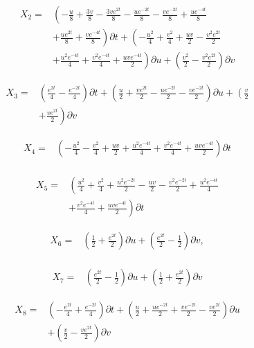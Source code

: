 \begin{align*}
X_{2}=&\left(- \frac{u}{8}+\frac{3 v}{8}- \frac{3 v e^{2 t}}{8}- \frac{u e^{- 2 t}}{8}- \frac{v e^{- 2 t}}{8}+\frac{u e^{- 4 t}}{8}\right.\\
&+\left.\frac{u e^{2 t}}{8}+\frac{v e^{- 4 t}}{8} \right)\partial t+\left(- \frac{u^{2}}{4}+\frac{v^{2}}{4}+\frac{u v}{2}- \frac{v^{2} e^{2 t}}{2}\right.\\
&+\left.\frac{u^{2} e^{- 4 t}}{4}+\frac{v^{2} e^{- 4 t}}{4}+\frac{u v e^{- 4 t}}{2} \right)\partial u+\left(\frac{v^{2}}{2}- \frac{v^{2} e^{2 t}}{2} \right)\partial v
\end{align*}

\begin{align*}
X_{3}=&\left(\frac{e^{2 t}}{4} - \frac{e^{- 2 t}}{4} \right)\partial t+\left(\frac{u}{2}+\frac{v e^{2 t}}{2}- \frac{u e^{- 2 t}}{2}- \frac{v e^{- 2 t}}{2} \right)\partial u+\left(\frac{v}{2}\right.\\
&+\left.\frac{v e^{2 t}}{2} \right)\partial v
\end{align*}

\begin{align*}
X_{4}=&\left(- \frac{u^{2}}{4}- \frac{v^{2}}{4}+\frac{u v}{2}+\frac{u^{2} e^{- 4 t}}{4}+\frac{v^{2} e^{- 4 t}}{4}+\frac{u v e^{- 4 t}}{2} \right)\partial t\\
\end{align*}

\begin{align*}
X_{5}=&\left(\frac{u^{2}}{4}+\frac{v^{2}}{4}+\frac{u^{2} e^{- 2 t}}{2}- \frac{u v}{2}- \frac{v^{2} e^{- 2 t}}{2}+\frac{u^{2} e^{- 4 t}}{4}\right.\\
&+\left.\frac{v^{2} e^{- 4 t}}{4}+\frac{u v e^{- 4 t}}{2} \right)\partial t
\end{align*}

\begin{align*}
X_{6}=&\left(\frac{1}{2}+\frac{e^{2 t}}{2} \right)\partial u+\left(\frac{e^{2 t}}{2} - \frac{1}{2} \right)\partial v,\\
\end{align*}

\begin{align*}
X_{7}=&\left(\frac{e^{2 t}}{2} - \frac{1}{2} \right)\partial u+\left(\frac{1}{2}+\frac{e^{2 t}}{2} \right)\partial v
\end{align*}

\begin{align*}
X_{8}=&\left(- \frac{e^{2 t}}{4}+\frac{e^{- 2 t}}{4} \right)\partial t+\left(\frac{u}{2}+\frac{u e^{- 2 t}}{2}+\frac{v e^{- 2 t}}{2}- \frac{v e^{2 t}}{2} \right)\partial u\\
&+\left(\frac{v}{2}- \frac{v e^{2 t}}{2} \right)\partial v
\end{align*}

